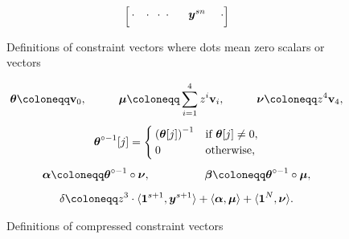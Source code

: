 \begin{figure}[h!]
\begin{align*}
\begin{bmatrix}
          \hspace{0.6mm} \cdot & 
          \hspace{0.1mm} \cdot & 
          \hspace{-1mm} \cdot & 
          \hspace{-1.8mm} \cdot &
          \hspace{2.6mm} {\boldsymbol{y}}^{sn} & 
          \hspace{1.2mm} \cdot \\[3pt]
      \end{bmatrix}
  \end{align*}
  \caption{Definitions of constraint vectors where dots mean zero scalars or vectors}
  \label{fig:conVec1}
\end{figure}

\begin{figure}[h!]
  \begin{gather*}
    \vecnb{\theta} \coloneqq \textbf{v}_{0}, \hspace{1cm}
    \vecnb{\mu} \coloneqq \sum_{i=1}^{4} z^{i} \textbf{v}_i, \hspace{1cm}
    \vecnb{\nu} \coloneqq z^4 \textbf{v}_4,\\[4pt]
    \vecnb{\theta}^{\circ -1}[j] = 
    \begin{cases}
      \left(\vecnb{\theta}[j]\right)^{-1} & \text{if } \vecnb{\theta}[j] \neq 0, \\
      0 & \text{otherwise,}
    \end{cases} \\[4pt]
    \vecnb{\alpha} \coloneqq \vecnb{\theta}^{\circ -1} \circ \vecnb{\nu}, \hspace{1.7cm}
    \vecnb{\beta} \coloneqq \vecnb{\theta}^{\circ -1} \circ \vecnb{\mu},\\[5pt]
    \delta \coloneqq z^3 \cdot \langle \vecnb{1}^{s+1}, \vecnb{y}^{s+1} \rangle + \langle \vecnb{\alpha}, \vecnb{\mu}\rangle + \langle \vecnb{1}^N, \vecnb{\nu}\rangle.
  \end{gather*}
  \caption{Definitions of compressed constraint vectors}
  \label{fig:conVec2}
\end{figure}

